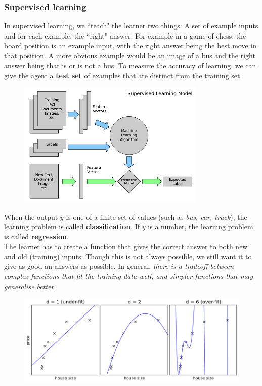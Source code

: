 \documentclass{article}
\newcommand{\n}[0]{\\[\baselineskip]}
\begin{document}
\subsubsection{Supervised learning}
In supervised learning, we ``teach" the learner two things: A set of example inputs and for each example, the ``right" answer. For example in a game of chess, the board position is an example input, with the right answer being the best move in that position. A more obvious example would be an image of a bus and the right answer being that is or is not a bus. To measure the accuracy of learning, we can give the agent a \textbf{test set} of examples that are distinct from the training set. 
\begin{figure}[H]
\centering
\includegraphics[width=0.8\textwidth, keepaspectratio]{imgs/supervised-learning.png}
\end{figure}
\noindent
When the output $y$ is one of a finite set of values (such as \textit{bus, car, truck}), the learning problem is called \textbf{classification}. If $y$ is a number, the learning problem is called \textbf{regression}. 
\n
The learner has to create a function that gives the correct answer to both new and old (training) inputs. Though this is not always possible, we still want it to give as good an answers as possible. In general, \textit{there is a tradeoff between complex functions that fit the training data well, and simpler functions that may generalise better}.
\begin{figure}[H]
\centering
\includegraphics[width=1\textwidth, keepaspectratio]{imgs/supervised-learning-fit.png}
\end{figure}
\end{document}
